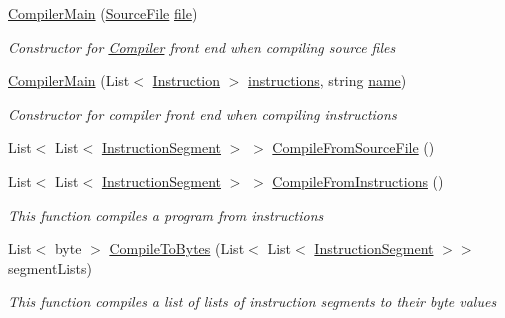 \begin{DoxyCompactItemize}
\item 
\hyperlink{class_c_p_u___o_s___simulator_1_1_compiler_1_1_compiler_main_a50d01f6e7db4b9facb3fdc84e8566fd7}{Compiler\+Main} (\hyperlink{class_c_p_u___o_s___simulator_1_1_compiler_1_1_source_file}{Source\+File} \hyperlink{class_c_p_u___o_s___simulator_1_1_compiler_1_1_compiler_main_ac6a47299c228ea71c732f35572fa666f}{file})
\begin{DoxyCompactList}\small\item\em Constructor for \hyperlink{namespace_c_p_u___o_s___simulator_1_1_compiler}{Compiler} front end when compiling source files \end{DoxyCompactList}\item 
\hyperlink{class_c_p_u___o_s___simulator_1_1_compiler_1_1_compiler_main_a7beede81b8461570391e1b0f8bc5f1ed}{Compiler\+Main} (List$<$ \hyperlink{class_c_p_u___o_s___simulator_1_1_c_p_u_1_1_instruction}{Instruction} $>$ \hyperlink{class_c_p_u___o_s___simulator_1_1_compiler_1_1_compiler_main_a0b0b37341f48e60f2ee769ea4ba760d2}{instructions}, string \hyperlink{class_c_p_u___o_s___simulator_1_1_compiler_1_1_compiler_main_a39370e54e39a32c7eb9dce2f9b49cefe}{name})
\begin{DoxyCompactList}\small\item\em Constructor for compiler front end when compiling instructions \end{DoxyCompactList}\item 
List$<$ List$<$ \hyperlink{class_c_p_u___o_s___simulator_1_1_compiler_1_1_backend_1_1_instruction_segment}{Instruction\+Segment} $>$ $>$ \hyperlink{class_c_p_u___o_s___simulator_1_1_compiler_1_1_compiler_main_af15e3239f4bc005fffd4e20e694a6593}{Compile\+From\+Source\+File} ()
\item 
List$<$ List$<$ \hyperlink{class_c_p_u___o_s___simulator_1_1_compiler_1_1_backend_1_1_instruction_segment}{Instruction\+Segment} $>$ $>$ \hyperlink{class_c_p_u___o_s___simulator_1_1_compiler_1_1_compiler_main_a9f4ff6dfc17da56e428d7a5d52eeda18}{Compile\+From\+Instructions} ()
\begin{DoxyCompactList}\small\item\em This function compiles a program from instructions \end{DoxyCompactList}\item 
List$<$ byte $>$ \hyperlink{class_c_p_u___o_s___simulator_1_1_compiler_1_1_compiler_main_aaaa9dbfb3784bd3f4f2f7c5c457a8d0e}{Compile\+To\+Bytes} (List$<$ List$<$ \hyperlink{class_c_p_u___o_s___simulator_1_1_compiler_1_1_backend_1_1_instruction_segment}{Instruction\+Segment} $>$$>$ segment\+Lists)
\begin{DoxyCompactList}\small\item\em This function compiles a list of lists of instruction segments to their byte values \end{DoxyCompactList}\end{DoxyCompactItemize}
